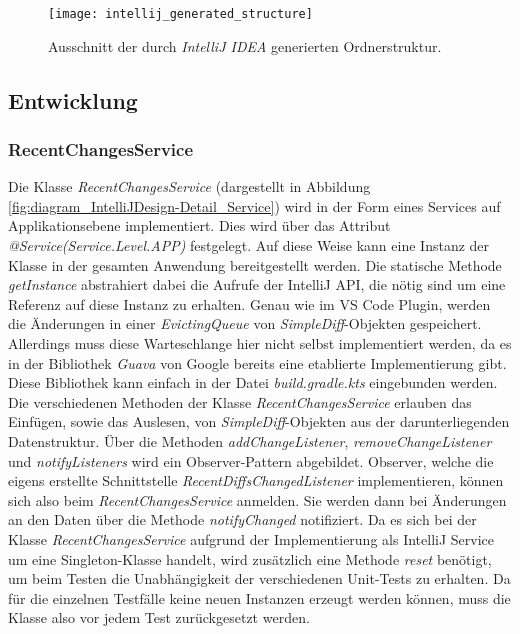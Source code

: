 \begin{figure}
    \centering
    \texttt{[image: intellij\_generated\_structure]}
    \caption{Ausschnitt der durch \emph{IntelliJ IDEA} generierten Ordnerstruktur.}
    \label{fig:intellij_generated_structure}
\end{figure}   

\subsection{Entwicklung}

\subsubsection{RecentChangesService}

Die Klasse \emph{RecentChangesService} (dargestellt in
Abbildung \ref{fig:diagram_IntelliJDesign-Detail_Service}) 
wird in der Form eines
Services auf Applikationsebene implementiert. Dies wird 
über das Attribut \emph{@Service(Service.Level.APP)} festgelegt. 
Auf diese Weise kann eine Instanz der Klasse in der gesamten Anwendung
bereitgestellt werden. Die statische Methode \emph{getInstance}
abstrahiert dabei die Aufrufe der IntelliJ API, die nötig sind um eine
Referenz auf diese Instanz zu erhalten. Genau wie im VS Code Plugin,
werden die Änderungen in einer \emph{EvictingQueue} von 
\emph{SimpleDiff}-Objekten gespeichert. Allerdings muss diese
Warteschlange hier nicht selbst implementiert werden, da es in
der Bibliothek \emph{Guava} von Google bereits eine etablierte 
Implementierung gibt. %
Diese Bibliothek kann einfach
in der Datei \emph{build.gradle.kts} eingebunden werden.
Die verschiedenen Methoden der Klasse \emph{RecentChangesService} erlauben
das Einfügen, sowie das Auslesen, von \emph{SimpleDiff}-Objekten aus
der darunterliegenden Datenstruktur. Über die Methoden \emph{addChangeListener},
\emph{removeChangeListener} und \emph{notifyListeners} wird ein Observer-Pattern
abgebildet. Observer, welche die eigens erstellte Schnittstelle 
\emph{RecentDiffsChangedListener} implementieren, können sich also
beim \emph{RecentChangesService} anmelden. Sie werden dann bei Änderungen 
an den Daten über die Methode \emph{notifyChanged} notifiziert.
Da es sich bei der Klasse \emph{RecentChangesService} aufgrund der Implementierung
als IntelliJ Service um eine Singleton-Klasse %
handelt, wird zusätzlich eine Methode \emph{reset} benötigt, um beim Testen
die Unabhängigkeit der verschiedenen Unit-Tests zu erhalten. Da für
die einzelnen Testfälle keine neuen Instanzen erzeugt werden können, muss
die Klasse also vor jedem Test zurückgesetzt werden.

